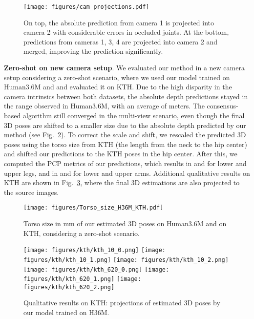 \documentclass[10pt,twocolumn,letterpaper]{article}
\newcommand{\revb}[1]{{#1}}
\begin{document}
\begin{figure}[hbtp]
  \centering
  \texttt{[image: figures/cam\_projections.pdf]}
  \caption{On top, the absolute prediction from camera 1 is projected into camera
  2 with considerable errors in occluded joints.  At the bottom,
  predictions from cameras 1, 3, 4 are projected into camera 2 and merged,
  improving the prediction significantly.}
  \label{fig:camera-projections}
\end{figure}


\noindent
\revb{
\textbf{Zero-shot on new camera setup}.
We evaluated our method in a new camera setup considering a zero-shot scenario, where we used our model trained on Human3.6M and and evaluated it on KTH.
Due to the high disparity in the camera intrinsics between both datasets, the absolute depth predictions stayed in the range observed in Human3.6M, with an average of  meters. The consensus-based algorithm still converged in the multi-view scenario, even though the final 3D poses are shifted to a smaller size due to the absolute depth predicted by our method (see Fig.~\ref{fig:shift-kth}).
To correct the scale and shift, we rescaled the predicted 3D poses using the torso size from KTH (the length from the neck to the hip center) and shifted our predictions to the KTH poses in the  hip center. After this, we computed the PCP metrics of our predictions, which results in  and  for lower and upper legs, and in  and  for lower and upper arms.
Additional qualitative results on KTH are shown in Fig.~\ref{fig:predictions_kth}, where the final 3D estimations are also projected to the source images.
}

\begin{figure}[hbtp]
  \centering
  \texttt{[image: figures/Torso\_size\_H36M\_KTH.pdf]}
  \caption{
  \revb{
  Torso size in mm of our estimated 3D poses on Human3.6M and on KTH, considering a zero-shot scenario.
  }
  }
  \label{fig:shift-kth}
\end{figure}

\begin{figure}[!h]
  \centering
  \texttt{[image: figures/kth/kth\_10\_0.png]}
  \texttt{[image: figures/kth/kth\_10\_1.png]}
  \texttt{[image: figures/kth/kth\_10\_2.png]}\\
  \texttt{[image: figures/kth/kth\_620\_0.png]}
  \texttt{[image: figures/kth/kth\_620\_1.png]}
  \texttt{[image: figures/kth/kth\_620\_2.png]}
  \caption{
  \revb{
    Qualitative results on KTH: projections of estimated 3D poses by our model trained on H36M.
    }
  }
  \label{fig:predictions_kth}
\end{figure}
\end{document}
